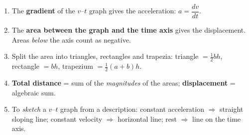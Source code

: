 \documentclass[11pt]{article}
\newcommand{\cle}[1]{{\popxbold\color{popdark}#1}}
\begin{document}
\begin{methode}
\begin{enumerate}
\item The \textbf{gradient} of the $v$–$t$ graph gives the \cle{acceleration}: $a=\dfrac{dv}{dt}$.
\item The \textbf{area between the graph and the time axis} gives the \cle{displacement}. Areas \emph{below} the axis count as negative.
\item Split the area into triangles, rectangles and trapezia: triangle $=\tfrac12 bh$, rectangle $=bh$, trapezium $=\tfrac12(a+b)h$.
\item \textbf{Total distance} = sum of the \emph{magnitudes} of the areas; \textbf{displacement} = algebraic sum.
\item To \emph{sketch} a $v$–$t$ graph from a description: constant acceleration $\Rightarrow$ straight sloping line; constant velocity $\Rightarrow$ horizontal line; rest $\Rightarrow$ line on the time axis.
\end{enumerate}
\end{methode}
\end{document}
